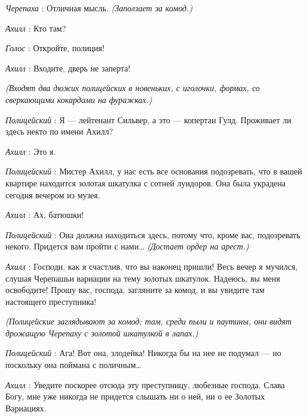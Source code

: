\documentclass[../main.tex]{subfiles}
\begin{document}
\begin{dialogue}
\emph{Черепаха} : Отличная мысль. \emph{(Заползает за комод.)}

\emph{Ахилл} : Кто там?

\emph{Голос} : Откройте, полиция!

\emph{Ахилл} : Входите, дверь не заперта!

\emph{(Входят два дюжих полицейских в новеньких, с иголочки, формах, со сверкающими кокардами на фуражках.)}

\emph{Полицейский} : Я --- лейтенант Сильвер, а это --- копертан Гулд. Проживает ли здесь некто по имени Ахилл?

\emph{Ахилл} : Это я.

\emph{Полицейский} : Мистер Ахилл, у нас есть все основания подозревать, что в вашей квартире находится золотая шкатулка с сотней луидоров. Она была украдена сегодня вечером из музея.

\emph{Ахилл} : Ах, батюшки!

\emph{Полицейский} : Она должна находиться здесь, потому что, кроме вас, подозревать некого. Придется вам пройти с нами\ldots{} \emph{(Достает ордер на арест.)}

\emph{Ахилл} : Господи, как я счастлив, что вы наконец пришли! Весь вечер я мучился, слушая Черепашьи вариации на тему золотых шкатулок. Надеюсь, вы меня освободите! Прошу вас, господа, загляните за комод, и вы увидите там настоящего преступника!

\emph{(Полицейские заглядывают за комод; там, среди пыли и паутины, они видят дрожащую Черепаху с золотой шкатулкой в лапах.)}

\emph{Полицейский} : Ага! Вот она, злодейка! Никогда бы на нее не подумал --- но поскольку она поймана с поличным\ldots{}

\emph{Ахилл} : Уведите поскорее отсюда эту преступницу, любезные господа. Слава Богу, мне уже никогда не придется слышать ни о ней, ни о ее Золотых Вариациях.

\end{dialogue}
\end{document}
